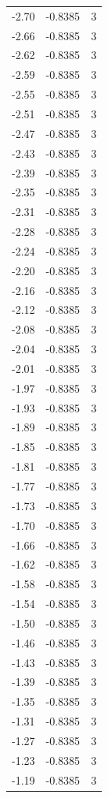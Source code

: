 \begin{longtable}{lrr}
  -2.70 & -0.8385 & 3 \\
  -2.66 & -0.8385 & 3 \\
  -2.62 & -0.8385 & 3 \\
  -2.59 & -0.8385 & 3 \\
  -2.55 & -0.8385 & 3 \\
  -2.51 & -0.8385 & 3 \\
  -2.47 & -0.8385 & 3 \\
  -2.43 & -0.8385 & 3 \\
  -2.39 & -0.8385 & 3 \\
  -2.35 & -0.8385 & 3 \\
  -2.31 & -0.8385 & 3 \\
  -2.28 & -0.8385 & 3 \\
  -2.24 & -0.8385 & 3 \\
  -2.20 & -0.8385 & 3 \\
  -2.16 & -0.8385 & 3 \\
  -2.12 & -0.8385 & 3 \\
  -2.08 & -0.8385 & 3 \\
  -2.04 & -0.8385 & 3 \\
  -2.01 & -0.8385 & 3 \\
  -1.97 & -0.8385 & 3 \\
  -1.93 & -0.8385 & 3 \\
  -1.89 & -0.8385 & 3 \\
  -1.85 & -0.8385 & 3 \\
  -1.81 & -0.8385 & 3 \\
  -1.77 & -0.8385 & 3 \\
  -1.73 & -0.8385 & 3 \\
  -1.70 & -0.8385 & 3 \\
  -1.66 & -0.8385 & 3 \\
  -1.62 & -0.8385 & 3 \\
  -1.58 & -0.8385 & 3 \\
  -1.54 & -0.8385 & 3 \\
  -1.50 & -0.8385 & 3 \\
  -1.46 & -0.8385 & 3 \\
  -1.43 & -0.8385 & 3 \\
  -1.39 & -0.8385 & 3 \\
  -1.35 & -0.8385 & 3 \\
  -1.31 & -0.8385 & 3 \\
  -1.27 & -0.8385 & 3 \\
  -1.23 & -0.8385 & 3 \\
  -1.19 & -0.8385 & 3 \\

\end{longtable}
